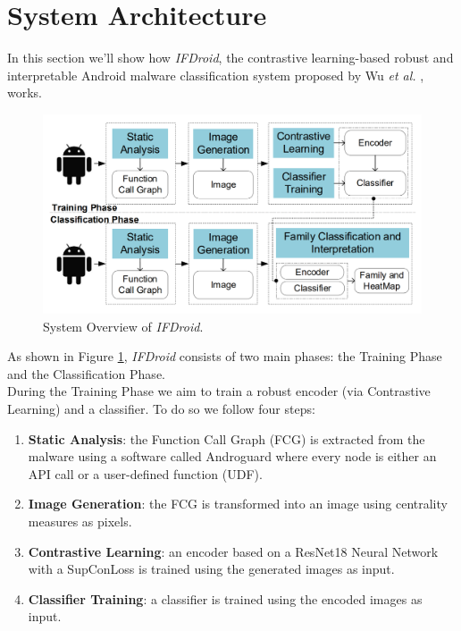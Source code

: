 \section{System Architecture}

In this section we'll show how \textit{IFDroid}, the contrastive learning-based robust and interpretable Android malware classification system proposed by Wu \textit{et al.} \cite{wu2022contrastive}, works. \\

\begin{figure}[H]
    \centering
    \includegraphics[width=0.75\linewidth]{Images/SOIFDroid.png}
    \caption{System Overview of \textit{IFDroid}.}
    \label{fig:SOIFDroid}
\end{figure}

\noindent As shown in Figure \ref{fig:SOIFDroid}, \textit{IFDroid} consists of two main phases: the Training Phase and the Classification Phase. \\
During the Training Phase we aim to train a robust encoder (via Contrastive Learning) and a classifier. To do so we follow four steps:

\begin{enumerate}
    \item \textbf{Static Analysis}: the Function Call Graph (FCG) is extracted from the malware using a software called Androguard \cite{desnos2011androguard} where every node is either an API call or a user-defined function (UDF).
    \item \textbf{Image Generation}: the FCG is transformed into an image using centrality measures as pixels.
    \item \textbf{Contrastive Learning}: an encoder based on a ResNet18 Neural Network with a SupConLoss is trained using the generated images as input.
    \item \textbf{Classifier Training}: a classifier is trained using the encoded images as input.
\end{enumerate}

